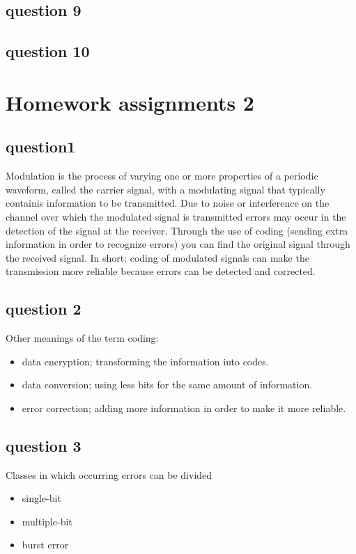 \documentclass[final]{scrreprt} %
\begin{document}
\section{question 9}
\section{question 10}


\chapter{Homework assignments 2}
\section{question1}
Modulation is the process of varying one or more properties of a periodic waveform, called the carrier signal, with a modulating signal that typically containis information to be transmitted.
Due to noise or interference on the channel over which the modulated signal is transmitted errors may occur in the detection of the signal at the receiver. Through the use of coding (sending extra information in order to recognize errors) you can find the original signal through the received signal. 
In short: coding of modulated signals can make the transmission more reliable because errors can be detected and corrected. 
\section{question 2}
Other meanings of the term coding:
\begin{itemize}
\item data encryption; transforming the information into codes.
\item data conversion;  using less bits for the same amount of information.
\item error correction; adding more information in order to make it more reliable.
\end{itemize}
\section{question 3}
Classes in which occurring errors can be divided
\begin{itemize}
\item single-bit
\item multiple-bit
\item burst error
\end{itemize}
\end{document}

